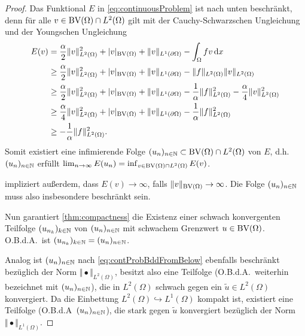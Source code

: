 \begin{proof}
  Das Funktional $E$ in \eqref{eq:continuousProblem} ist nach unten beschränkt,
  denn für alle $v\in \textup{BV}(\Omega)\cap L^2(\Omega)$ gilt mit der Cauchy-Schwarzschen
  Ungleichung und der Youngschen Ungleichung
  \begin{equation}
    \label{eq:contProbBddFromBelow}
    \begin{aligned}
      E(v)&=\frac{\alpha}{2}\Vert v\Vert_{L^2(\Omega)}^2 + |v|_{\textup{BV}(\Omega)}
      +\Vert v\Vert_{L^1(\partial\Omega)}-\int_\Omega fv\,\mathrm{d}x\\
      &\geq 
      \frac{\alpha}{2}\Vert v\Vert_{L^2(\Omega)}^2 + |v|_{\textup{BV}(\Omega)}
      +\Vert v\Vert_{L^1(\partial\Omega)}
      -\Vert f\Vert_{L^2(\Omega)}\Vert v\Vert_{L^2(\Omega)}\\
      &\geq 
      \frac{\alpha}{2}\Vert v\Vert_{L^2(\Omega)}^2 + |v|_{\textup{BV}(\Omega)}
      +\Vert v\Vert_{L^1(\partial\Omega)}
      -\frac{1}{\alpha}\Vert f\Vert_{L^2(\Omega)}^2
      -\frac{\alpha}{4}\Vert v\Vert_{L^2(\Omega)}^2\\
      &\geq 
      \frac{\alpha}{4}\Vert v\Vert_{L^2(\Omega)}^2 + |v|_{\textup{BV}(\Omega)}
      +\Vert v\Vert_{L^1(\partial\Omega)}-\frac{1}{\alpha}\Vert
      f\Vert_{L^2(\Omega)}^2\\
      &\geq -\frac{1}{\alpha}\Vert f\Vert_{L^2(\Omega)}^2.
    \end{aligned}
  \end{equation}
  Somit existiert eine infimierende Folge
  $(u_n)_{n\in\mathbb{N}}\subset\textup{BV}(\Omega)\cap
  L^2(\Omega)$ von $E$, d.h.\ $(u_n)_{n\in\mathbb{N}}$ erfüllt
  $\lim_{n\rightarrow\infty}E(u_n) =
  \inf_{v\in\textup{BV}(\Omega)\cap
    L^2(\Omega)}E(v)$. 

   impliziert außerdem, dass
  $E(v)\rightarrow\infty$, falls
  $\Vert v\Vert_{\textup{BV}(\Omega)}\rightarrow\infty$.
  Die Folge $(u_n)_{n\in\mathbb{N}}$ muss also insbesondere beschränkt sein.

  \medbreak
  Nun garantiert \cref{thm:compactness} die Existenz einer schwach konvergenten
  Teilfolge $(u_{n_k})_{k\in\mathbb{N}}$ von $(u_n)_{n\in\mathbb{N}}$ mit schwachem Grenzwert
  $u\in\textup{BV}(\Omega)$. O.B.d.A.\ ist $(u_{n_k})_{k\in\mathbb{N}}=(u_n)_{n\in\mathbb{N}}$.

  Analog ist $(u_n)_{n\in\mathbb{N}}$ nach \cref{eq:contProbBddFromBelow} ebenfalls
  beschränkt bezüglich der Norm $\Vert\bullet\Vert_{L^2(\Omega)}$, besitzt also
  eine Teilfolge (O.B.d.A.\ weiterhin bezeichnet mit $(u_n)_{n\in\mathbb{N}}$), die
  in $L^2(\Omega)$ schwach gegen ein $\tilde{u}\in L^2(\Omega)$ konvergiert.
  Da die Einbettung $L^2(\Omega)\hookrightarrow L^1(\Omega)$ kompakt ist, 
  existiert eine Teilfolge (O.B.d.A\ $(u_n)_{n\in\mathbb{N}}$), die stark gegen
  $\tilde u$ konvergiert bezüglich der Norm $\Vert\bullet\Vert_{L^1(\Omega)}$.


\end{proof}
